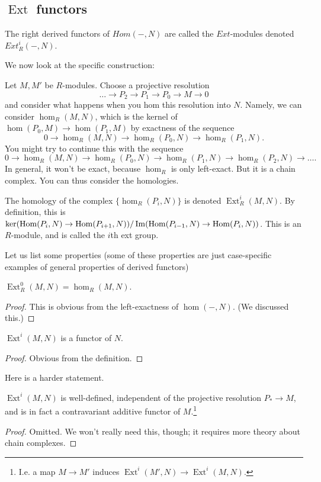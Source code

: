 \newcommand{\ext}{\operatorname{Ext}}
\subsection{$\ext$ functors}

\begin{definition} The right derived functors of $Hom(-,N)$ are
called the $Ext$-modules denoted $Ext^i_R(-,N)$.
\end{definition}
We now look at the specific construction:

Let $M, M'$ be $R$-modules. Choose a projective resolution
\[ \dots \to P_2 \to P_1 \to P_0 \to M \to 0  \]
and consider what happens when you hom this resolution into $N$.
Namely, we can
consider $\hom_R(M,N)$, which is the kernel of $\hom(P_0, M)
\to\hom(P_1, M) $
by exactness of the sequence
\[ 0 \to \hom_R(M,N) \to \hom_R(P_0, N) \to \hom_R(P_1, N) . \]
You might try to continue this with the sequence
\[ 0 \to \hom_R(M,N) \to \hom_R(P_0, N) \to \hom_R(P_1, N) \to
\hom_R(P_2, N)
\to \dots. \]
In general, it won't be exact, because $\hom_R$ is only
left-exact. But it is a
chain complex. You can thus consider the homologies.

\begin{definition}
The homology of the complex $\{\hom_R(P_i, N)\}$ is denoted
$\ext^i_R(M,N)$. By
definition, this is $\ker(\operatorname{Hom}(P_i,N) \to \operatorname{Hom}(P_{i+1},
N))/\operatorname{Im}(\operatorname{Hom}(P_{i-1},
N) \to \operatorname{Hom}(P_i,N))$. This is an $R$-module, and is called the
$i$th ext group.
\end{definition}



Let us list some properties (some of these properties are just
case-specific examples of general properties of derived
functors)

\begin{proposition}
$\ext_R^0(M,N) = \hom_R(M,N)$.
\end{proposition}
\begin{proof}
This is obvious from the left-exactness of $\hom(-,N)$. (We
discussed this.)
\end{proof}

\begin{proposition}
$\ext^i(M,N)$ is a functor of $N$.
\end{proposition}
\begin{proof}
Obvious from the definition.
\end{proof}

Here is a harder statement.
\begin{proposition}
$\ext^i(M,N)$ is well-defined, independent of the projective
resolution $P_*
\to M$, and is in fact a contravariant additive functor of
$M$.\footnote{I.e. a map $M
\to M'$ induces $\ext^i(M', N) \to \ext^i(M,N)$.}
\end{proposition}
\begin{proof}
Omitted. We won't really need this, though; it requires more
theory about
chain complexes.
\end{proof}


